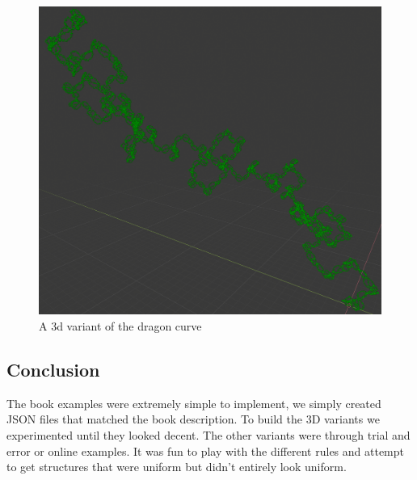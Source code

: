 \begin{figure}[h]
    \centering
    \includegraphics[width=\textwidth]{figures/L-systems/dragon3-3d.png}
    \caption{A 3d variant of the dragon curve}
\end{figure}

\subsection{Conclusion}
The book examples were extremely simple to implement, we simply
created JSON files that matched the book description. To build the 3D
variants we experimented until they looked decent. The other variants were
through trial and error or online examples. It was fun to play with the
different rules and attempt to get structures that were uniform but didn't
entirely look uniform.
